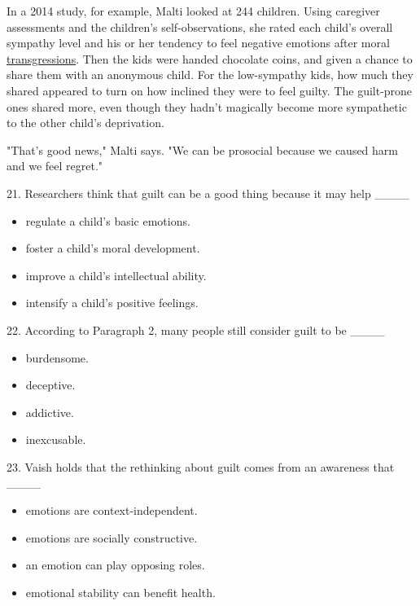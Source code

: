 \documentclass[UTF8,11pt]{ctexart}
\begin{document}
In a 2014 study, for example, Malti looked at 244 children. Using caregiver assessments and the children's self-observations, she rated each child's overall sympathy level and his or her tendency to feel negative emotions after moral \uline{transgressions}. Then the kids were handed chocolate coins, and given a chance to share them with an anonymous child. For the low-sympathy kids, how much they shared appeared to turn on how inclined they were to feel guilty. The guilt-prone ones shared more, even though they hadn't magically become more sympathetic to the other child's deprivation.


"That's good news," Malti says. "We can be prosocial because we caused harm and we feel regret."


21. Researchers think that guilt can be a good thing because it may help \_\_\_\_


\begin{itemize}[leftmargin=2em,itemsep=.2em,topsep=.4em]\item[A.] regulate a child's basic emotions.
\item[B.] foster a child's moral development.
\item[C.] improve a child's intellectual ability.
\item[D.] intensify a child's positive feelings.
\end{itemize}

22. According to Paragraph 2, many people still consider guilt to be \_\_\_\_


\begin{itemize}[leftmargin=2em,itemsep=.2em,topsep=.4em]\item[A.] burdensome.
\item[B.] deceptive.
\item[C.] addictive.
\item[D.] inexcusable.
\end{itemize}

23. Vaish holds that the rethinking about guilt comes from an awareness that \_\_\_\_


\begin{itemize}[leftmargin=2em,itemsep=.2em,topsep=.4em]\item[A.] emotions are context-independent.
\item[B.] emotions are socially constructive.
\item[C.] an emotion can play opposing roles.
\item[D.] emotional stability can benefit health.
\end{itemize}
\end{document}

